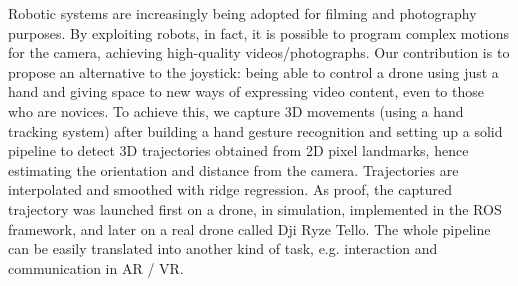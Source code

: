 Robotic systems are increasingly being adopted for filming and photography purposes. By exploiting robots, in fact, it is possible to program complex motions for the camera, achieving high-quality videos/photographs. Our contribution is to propose an alternative to the joystick: being able to control a drone using just a hand and giving space to new ways of expressing video content, even to those who are novices. To achieve this, we capture 3D movements (using a hand tracking system) after building a hand gesture recognition and setting up a solid pipeline to detect 3D trajectories obtained from 2D pixel landmarks, hence estimating the orientation and distance from the camera. Trajectories are interpolated and smoothed with ridge regression. As proof, the captured trajectory was launched first on a drone, in simulation, implemented in the ROS framework, and later on a real drone called Dji Ryze Tello. The whole pipeline can be easily translated into another kind of task, e.g. interaction and communication in AR / VR.